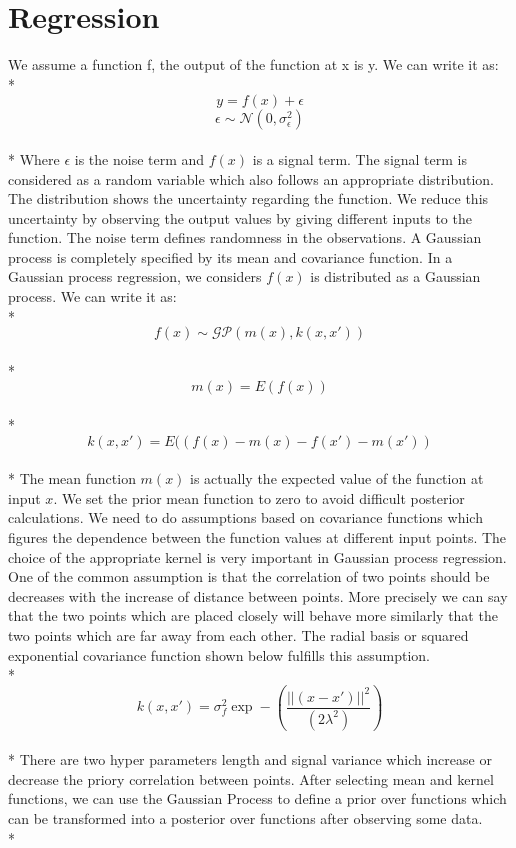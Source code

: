 \documentclass{article}
\begin{document}
\section{Regression}
We assume a function f, the output of the function at x is y. We can write it as:
\\*
$$y = f(x)+\epsilon$$
$$\epsilon \sim \mathcal{N}{\left(0, \sigma_{\epsilon}^2\right)}$$
\\*
Where $\epsilon$ is the noise term and $f(x)$ is a signal term. The signal term is considered as a random variable which also follows an appropriate distribution. The distribution shows the uncertainty regarding the function. We reduce this uncertainty by observing the output values by giving different inputs to the function.   The noise term defines randomness in the observations. A Gaussian process is completely specified by its mean and covariance function.  In a Gaussian process regression, we considers $f(x)$ is distributed as a Gaussian process. We can write it as:
\\*
$${f(x)\sim \mathcal{GP}{\left(m(x),k(x,x')\right)}}$$
\\*
$$m(x) = E(f(x))$$
\\*
$${k(x,x')= E((f(x)-m(x)-f(x')-m(x'))}$$
\\*
The mean function $m(x)$ is actually the expected value of the function at input $x$. We set the prior mean function to zero to avoid difficult posterior calculations. We need to do assumptions based on covariance functions which figures the dependence between the function values at different input points. 
The choice of the appropriate kernel is very important in Gaussian process regression. One of the common assumption is that the correlation of two points should be decreases with the increase of distance between points. More precisely we can say that the two points which are placed closely will behave more similarly that the two points which are far away from each other. The radial basis or squared exponential covariance function shown below fulfills this assumption. 
\\*
$$k(x,x')=\sigma_f^2 \exp-(\frac{{{||(x-x')||}^2}}{(2\lambda^2)})$$
\\*
There are two hyper parameters length and signal variance which increase or decrease the priory correlation between points. 
After selecting mean and kernel functions, we can use the Gaussian Process to define a prior over functions which can be transformed into a posterior over functions after observing some data.
\\*
\end{document}
